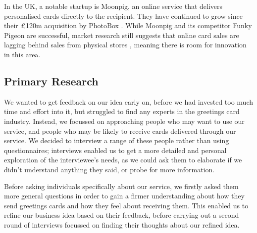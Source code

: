 \documentclass[10pt, a4paper]{article}
\begin{document}
In the UK, a notable startup is Moonpig, an online service that delivers personalised cards directly to the recipient. They have continued to grow since their £120m acquisition by PhotoBox \citep{bbc}. While Moonpig and its competitor Funky Pigeon are successful, market research still suggests that online card sales are lagging behind sales from physical stores \citep{mintel}, meaning there is room for innovation in this area.

\subsection*{Primary Research}
We wanted to get feedback on our idea early on, before we had invested too much time and effort into it, but struggled to find any experts in the greetings card industry. Instead, we focussed on approaching people who may want to use our service, and people who may be likely to receive cards delivered through our service. We decided to interview a range of these people rather than using questionnaires; interviews enabled us to get a more detailed and personal exploration of the interviewee’s needs, as we could ask them to elaborate if we didn’t understand anything they said, or probe for more information.

Before asking individuals specifically about our service, we firstly asked them more general questions in order to gain a firmer understanding about how they send greetings cards and how they feel about receiving them. This enabled us to refine our business idea based on their feedback, before carrying out a second round of interviews focussed on finding their thoughts about our refined idea.
\end{document}

